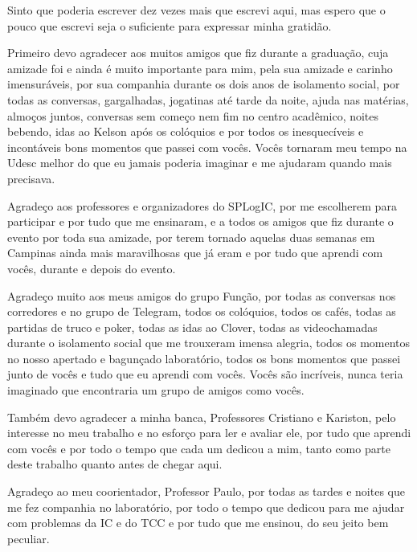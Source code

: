 \begin{agradecimentos}

    Sinto que poderia escrever dez vezes mais que escrevi aqui, mas
    espero que o pouco que escrevi seja o suficiente para expressar minha gratidão.

    Primeiro devo agradecer aos muitos amigos que fiz durante a graduação, cuja amizade foi e ainda é muito importante para mim,
    pela sua amizade e carinho imensuráveis, por sua companhia durante os dois anos de isolamento social, por todas as conversas, gargalhadas, jogatinas até tarde da noite,
    ajuda nas matérias, almoços juntos, conversas sem começo nem fim no centro acadêmico, noites bebendo, idas ao Kelson após os colóquios e por todos os inesquecíveis e
    incontáveis bons momentos que passei com vocês. Vocês tornaram meu tempo na Udesc melhor do que eu jamais poderia imaginar e me ajudaram quando mais precisava.

    Agradeço aos professores e organizadores do SPLogIC, por me escolherem para participar e por tudo que me ensinaram,
    e a todos os amigos que fiz durante o evento %
    por toda sua amizade, por terem tornado aquelas duas semanas em Campinas ainda mais maravilhosas que já eram e por tudo que aprendi com vocês, durante e depois do evento.

    Agradeço muito aos meus amigos do grupo Função, por todas as conversas nos corredores e no grupo de Telegram, todos os colóquios, todos os cafés,
    todas as partidas de truco e poker, todas as idas ao Clover, todas as videochamadas durante o isolamento social que me trouxeram imensa alegria, todos os momentos
    no nosso apertado e bagunçado laboratório, todos os bons momentos que passei junto de vocês e tudo que eu aprendi com vocês. Vocês são incríveis, nunca teria imaginado
    que encontraria um grupo de amigos como vocês.

    Também devo agradecer a minha banca, Professores Cristiano e Kariston, pelo interesse no meu trabalho e no esforço para ler e avaliar ele,
    por tudo que aprendi com vocês e por todo o tempo que cada um dedicou a mim, tanto como parte deste trabalho quanto antes de chegar aqui.

    Agradeço ao meu coorientador, Professor Paulo, por todas as tardes e noites que me fez companhia no laboratório, por todo o tempo que dedicou para me ajudar com problemas
    da IC e do TCC e por tudo que me ensinou, do seu jeito bem peculiar.


\end{agradecimentos}
